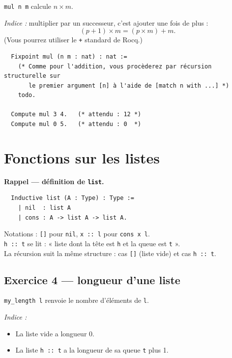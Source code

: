 \documentclass[11pt,a4paper]{article}
\newenvironment{rappel}{
\begin{mdframed}[style=rappelstyle]}{
\end{mdframed}}
\newenvironment{exo}{
\begin{mdframed}[style=exostyle]}{
\end{mdframed}}
\newcommand{\cq}[1]{\texttt{#1}}
\begin{document}
\cq{mul n m} calcule $n \times m$.

\textit{Indice :} multiplier par un successeur, c'est ajouter une fois de plus :
\[
  (p + 1) \times m = (p \times m) + m.
\]
(Vous pourrez utiliser le \cq{+} standard de Rocq.)

\begin{exo}
\begin{verbatim}
  Fixpoint mul (n m : nat) : nat :=
    (* Comme pour l'addition, vous procèderez par récursion structurelle sur
       le premier argument [n] à l'aide de [match n with ...] *)
    todo.

  Compute mul 3 4.   (* attendu : 12 *)
  Compute mul 0 5.   (* attendu : 0  *)
\end{verbatim}
\end{exo}

\section{Fonctions sur les listes}

\begin{rappel}
  \textbf{Rappel — définition de \cq{list}.}
\begin{verbatim}
  Inductive list (A : Type) : Type :=
    | nil  : list A
    | cons : A -> list A -> list A.
\end{verbatim}
  Notations : \cq{[]} pour \cq{nil}, \cq{x :: l} pour \cq{cons x l}.\\
  \cq{h :: t} se lit : « liste dont la tête est \cq{h} et la queue est \cq{t} ».\\
  La récursion suit la même structure : cas \cq{[]} (liste vide) et cas \cq{h :: t}.
\end{rappel}

\subsection{Exercice 4 — longueur d'une liste}

\cq{my_length l} renvoie le nombre d'éléments de \cq{l}.

\textit{Indice :}
\begin{itemize}[noitemsep,topsep=2pt]
  \item La liste vide a longueur 0.
  \item La liste \cq{h :: t} a la longueur de sa queue \cq{t} plus 1.
\end{itemize}
\end{document}
